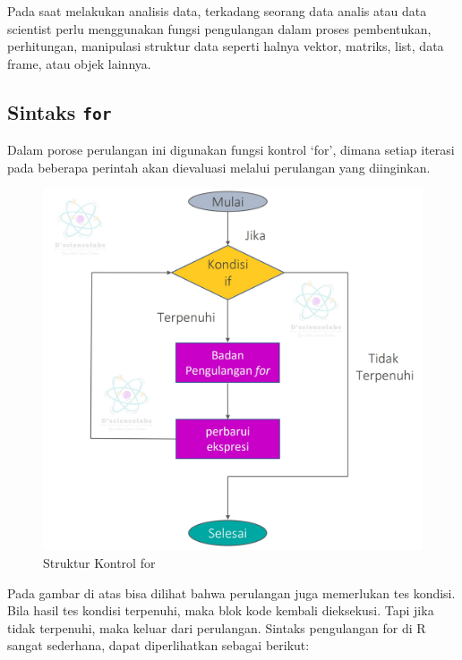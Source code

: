 \documentclass[
]{book}
\begin{document}
Pada saat melakukan analisis data, terkadang seorang data analis atau data scientist perlu menggunakan fungsi pengulangan dalam proses pembentukan, perhitungan, manipulasi struktur data seperti halnya vektor, matriks, list, data frame, atau objek lainnya.

\hypertarget{sintaks-for}{%
\subsection{\texorpdfstring{Sintaks \texttt{for}}{Sintaks for}}\label{sintaks-for}}

Dalam porose perulangan ini digunakan fungsi kontrol `for', dimana setiap iterasi pada beberapa perintah akan dievaluasi melalui perulangan yang diinginkan.

\begin{figure}

{\centering \includegraphics[width=1\linewidth]{./images/Bab6/for} 

}

\caption{Struktur Kontrol for}\label{fig:for}
\end{figure}

Pada gambar di atas bisa dilihat bahwa perulangan juga memerlukan tes kondisi. Bila hasil tes kondisi terpenuhi, maka blok kode kembali dieksekusi. Tapi jika tidak terpenuhi, maka keluar dari perulangan. Sintaks pengulangan for di R sangat sederhana, dapat diperlihatkan sebagai berikut:
\end{document}
